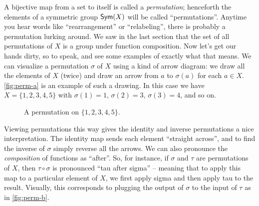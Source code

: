 A bijective map from a set to itself is called a \emph{permutation}; henceforth the elements of a symmetric group \(\mathsf{Sym}(X)\) will be called ``permutations''.
Anytime you hear words like ``rearrangement'' or ``relabeling'', there is probably a permutation lurking around.
We saw in the last section that the set of all permutations of \(X\) is a group under function composition.
Now let's get our hands dirty, so to speak, and see some examples of exactly what that means.
We can visualize a permutation \(\sigma\) of \(X\) using a kind of arrow diagram: we draw all the elements of \(X\) (twice) and draw an arrow from \(a\) to \(\sigma(a)\) for each \(a \in X\).
\autoref{fig:perm-a} is an example of such a drawing.
In this case we have \(X = \{1,2,3,4,5\}\) with \(\sigma(1) = 1\), \(\sigma(2) = 3\), \(\sigma(3) = 4\), and so on.

\begin{figure}[h]
\begin{center}
\caption{\label{fig:perm-a}A permutation on \(\{1,2,3,4,5\}\).}
\end{center}
\end{figure}

Viewing permutations this way gives the identity and inverse permutations a nice interpretation.
The identity map sends each element ``straight across'', and to find the inverse of \(\sigma\) simply reverse all the arrows.
We can also pronounce the \emph{composition} of functions as ``after''.
So, for instance, if \(\sigma\) and \(\tau\) are permutations of \(X\), then \(\tau \circ \sigma\) is pronounced ``tau after sigma'' -- meaning that to apply this map to a particular element of \(X\), we first apply sigma and then apply tau to the result.
Visually, this corresponds to plugging the output of \(\sigma\) to the input of \(\tau\) as in \autoref{fig:perm-b}.

